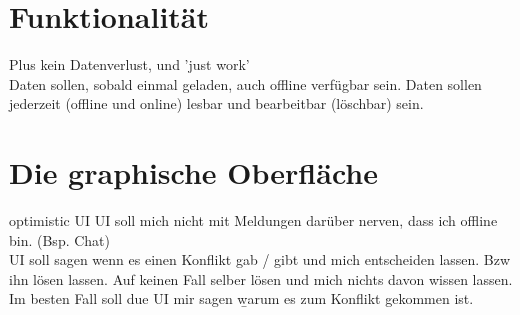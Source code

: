 \section{Funktionalität}
 Plus kein Datenverlust, und 'just work'\\
Daten sollen, sobald einmal geladen, auch offline verfügbar sein.
Daten sollen jederzeit (offline und online) lesbar und bearbeitbar (löschbar) sein.
%
%
\section{Die graphische Oberfläche}
\Gls{optimistic UI}
\gls{UI} soll mich nicht mit Meldungen darüber nerven, dass ich offline bin. (Bsp. Chat)\\
\gls{UI} soll sagen wenn es einen Konflikt gab / gibt und mich entscheiden lassen. Bzw ihn lösen lassen.
Auf keinen Fall selber lösen und mich nichts davon wissen lassen.\\
Im besten Fall soll due UI mir sagen \b{warum} es zum Konflikt gekommen ist.